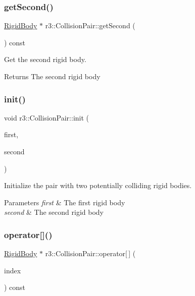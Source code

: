 \subsubsection{\texorpdfstring{get\+Second()}{getSecond()}}
{\footnotesize\ttfamily \mbox{\hyperlink{classr3_1_1_rigid_body}{Rigid\+Body}} $\ast$ r3\+::\+Collision\+Pair\+::get\+Second (\begin{DoxyParamCaption}{ }\end{DoxyParamCaption}) const}



Get the second rigid body. 

\begin{DoxyReturn}{Returns}
The second rigid body 
\end{DoxyReturn}
\mbox{\label{classr3_1_1_collision_pair_a7e64e731162cfdc3222d8f02b7c886b1}} 
\subsubsection{\texorpdfstring{init()}{init()}}
{\footnotesize\ttfamily void r3\+::\+Collision\+Pair\+::init (\begin{DoxyParamCaption}\item[{\mbox{\hyperlink{classr3_1_1_rigid_body}{Rigid\+Body}} $\ast$}]{first,  }\item[{\mbox{\hyperlink{classr3_1_1_rigid_body}{Rigid\+Body}} $\ast$}]{second }\end{DoxyParamCaption})}



Initialize the pair with two potentially colliding rigid bodies. 


\begin{DoxyParams}{Parameters}
{\em first} & The first rigid body \\
\hline
{\em second} & The second rigid body \\
\hline
\end{DoxyParams}
\mbox{\label{classr3_1_1_collision_pair_a8d56c936cb56821247c5b1a684578c0a}} 
\subsubsection{\texorpdfstring{operator[]()}{operator[]()}}
{\footnotesize\ttfamily \mbox{\hyperlink{classr3_1_1_rigid_body}{Rigid\+Body}} $\ast$ r3\+::\+Collision\+Pair\+::operator\mbox{[}$\,$\mbox{]} (\begin{DoxyParamCaption}\item[{int}]{index }\end{DoxyParamCaption}) const}



